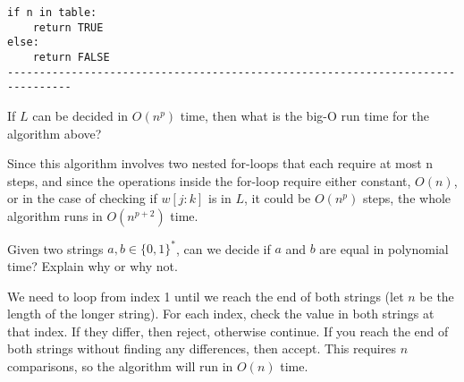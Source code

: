 \documentclass[12pt]{exam}
\begin{document}
\begin{questions}
\begin{verbatim}
if n in table:
    return TRUE
else:
    return FALSE
--------------------------------------------------------------------------------
\end{verbatim}

If $L$ can be decided in $O(n^p)$ time, then what is the big-O run time for the algorithm above? 

\begin{solution}
Since this algorithm involves two nested for-loops that each require at most n steps, and since the operations inside the for-loop require either constant, $O(n)$, or in the case of checking if $w[j:k]$ is in $L$, it could be $O(n^p)$ steps, the whole algorithm runs in $O(n^{p+2})$ time. 
\end{solution}
\vfill

\question Given two strings $a, b \in \{0,1\}^*$, can we decide if $a$ and $b$ are equal in polynomial time?  Explain why or why not.
\begin{solution}
We need to loop from index 1 until we reach the end of both strings (let $n$ be the length of the longer string). For each index, check the value in both strings at that index.  If they differ, then reject, otherwise continue.  If you reach the end of both strings without finding any differences, then accept.  This requires $n$ comparisons, so the algorithm will run in $O(n)$ time.  
\end{solution}
\vfill

\end{questions}
\end{document}

